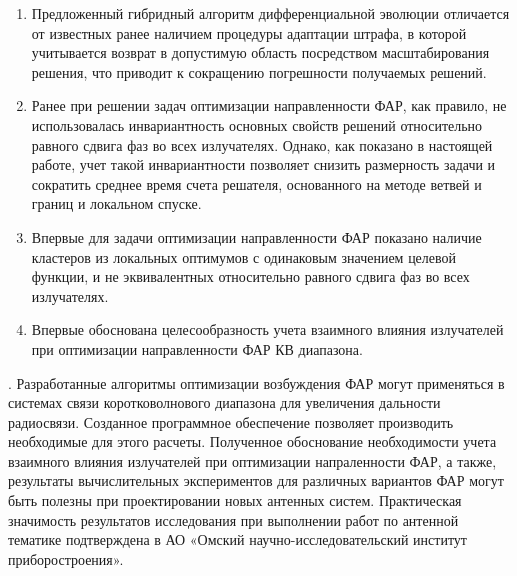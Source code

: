 \begin{enumerate}
  \item Предложенный гибридный алгоритм дифференциальной эволюции отличается от известных ранее наличием процедуры адаптации штрафа, в которой учитывается возврат в допустимую область посредством масштабирования решения, что приводит к сокращению погрешности получаемых решений.
  \item Ранее при решении задач оптимизации направленности ФАР, как правило, не использовалась инвариантность основных свойств решений относительно равного сдвига фаз во всех излучателях. Однако, как показано в настоящей работе, учет такой инвариантности позволяет снизить размерность задачи и сократить среднее время счета решателя, основанного на методе ветвей и границ и локальном спуске.
  \item Впервые для задачи оптимизации направленности ФАР  показано наличие кластеров из локальных оптимумов с одинаковым значением целевой функции, и не эквивалентных относительно равного сдвига фаз во всех излучателях.
  \item Впервые обоснована целесообразность учета взаимного влияния излучателей при оптимизации направленности ФАР КВ диапазона.
\end{enumerate}


{\influence}.
Разработанные алгоритмы оптимизации возбуждения ФАР могут  применяться в системах связи коротковолнового диапазона для увеличения дальности 
радиосвязи.
Созданное программное обеспечение позволяет производить необходимые для этого расчеты.
Полученное обоснование необходимости учета взаимного влияния излучателей при оптимизации напраленности ФАР, а также, результаты вычислительных экспериментов для различных вариантов ФАР могут быть полезны при проектировании новых антенных систем.
Практическая значимость результатов исследования при выполнении работ по антенной тематике 
подтверждена в АО «Омский научно-исследовательский институт приборостроения».

